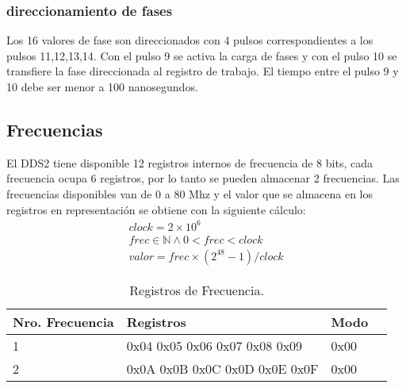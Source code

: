 \subsubsection{direccionamiento de fases}
Los 16 valores de fase son direccionados con 4 pulsos correspondientes a los 
pulsos 11,12,13,14. Con el pulso 9 se activa la carga de fases y con el pulso 10
se transfiere la fase direccionada al registro de trabajo.
El tiempo entre el pulso 9 y 10 debe ser menor a 100 nanosegundos.

\subsection{Frecuencias}

El DDS2 tiene disponible 12 registros internos de frecuencia de 8 bits, cada frecuencia ocupa 6 registros, 
por lo tanto se pueden almacenar 2 frecuencias.
Las frecuencias disponibles van de 0 a 80 Mhz y el valor que se almacena en los registros
en representaci\'on se obtiene con la siguiente c\'alculo:
\noindent
\begin{gather}
    clock = 2 \times 10^{6} \\
    frec \in \mathbb{N} \land 0 < frec < clock\\
    valor = frec \times (2^{48} -1 ) / clock
\end{gather}

\begin{table}[ht]
    \centering
    \begin{tabular}{|l|l|l|l|}
    \hline
    Nro. Frecuencia    & Registros       & Modo \\
    \hline
     1 & 0x04 0x05 0x06 0x07 0x08 0x09   & 0x00 \\
    \hline
     2 & 0x0A 0x0B 0x0C 0x0D 0x0E 0x0F   & 0x00 \\
    \hline
\end{tabular}
\caption{\label{tab:registros_frec}Registros de Frecuencia.}
\end{table}

